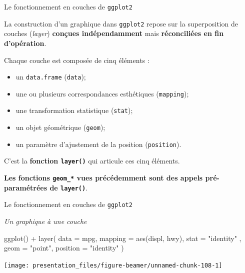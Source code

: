 \documentclass[12pt,handout,ignorenonframetext,]{beamer}
\newenvironment{Shaded}{}{}
\newcommand{\KeywordTok}[1]{\textcolor[rgb]{0.00,0.00,1.00}{{#1}}}
\newcommand{\DataTypeTok}[1]{{#1}}
\newcommand{\StringTok}[1]{\textcolor[rgb]{0.00,0.50,0.50}{{#1}}}
\newcommand{\NormalTok}[1]{{#1}}
\providecommand{\tightlist}{%
\setlength{\itemsep}{0pt}\setlength{\parskip}{0pt}}
\renewenvironment{Shaded}{\begin{snugshade}}{\end{snugshade}}
\begin{document}
\begin{frame}[fragile]{\large Le fonctionnement en \og couches \fg{} de
\texttt{ggplot2}}

La construction d'un graphique dans \texttt{ggplot2} repose sur la
superposition de couches (\emph{layer}) \textbf{conçues indépendamment}
mais \textbf{réconciliées en fin d'opération}.

\pause Chaque couche est composée de cinq éléments :

\begin{itemize}
\tightlist
\item
  un \texttt{data.frame} (\texttt{data});
\item
  une ou plusieurs correspondances esthétiques (\texttt{mapping});
\item
  une transformation statistique (\texttt{stat});
\item
  un objet géométrique (\texttt{geom});
\item
  un paramètre d'ajustement de la position (\texttt{position}).
\end{itemize}

C'est la \textbf{fonction \texttt{layer()}} qui articule ces cinq
éléments.

\pause 

\textbf{Les fonctions \texttt{geom\_*} vues précédemment sont des appels
pré-paramétrées de \texttt{layer()}}.

\end{frame}

\begin{frame}[fragile]{\large Le fonctionnement en \og couches \fg{} de
\texttt{ggplot2}}

\emph{Un graphique à une couche}

\footnotesize \centering

\begin{Shaded}
\begin{Highlighting}[]
\KeywordTok{ggplot}\NormalTok{() +}\StringTok{ }\KeywordTok{layer}\NormalTok{(}
  \DataTypeTok{data =} \NormalTok{mpg, }\DataTypeTok{mapping =} \KeywordTok{aes}\NormalTok{(displ, hwy), }\DataTypeTok{stat =} \StringTok{"identity"}
  \NormalTok{, }\DataTypeTok{geom =} \StringTok{"point"}\NormalTok{, }\DataTypeTok{position =} \StringTok{"identity"}
\NormalTok{)}
\end{Highlighting}
\end{Shaded}

\texttt{[image: presentation\_files/figure-beamer/unnamed-chunk-108-1]}

\end{frame}
\end{document}
